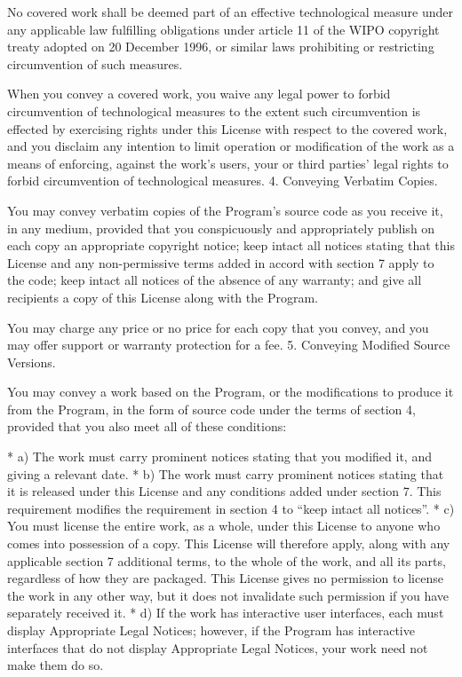 {\begin{multicols}{4}
No covered work shall be deemed part of an effective technological measure under any applicable law fulfilling obligations under article 11 of the WIPO copyright treaty adopted on 20 December 1996, or similar laws prohibiting or restricting circumvention of such measures.

When you convey a covered work, you waive any legal power to forbid circumvention of technological measures to the extent such circumvention is effected by exercising rights under this License with respect to the covered work, and you disclaim any intention to limit operation or modification of the work as a means of enforcing, against the work's users, your or third parties' legal rights to forbid circumvention of technological measures.
4. Conveying Verbatim Copies.

You may convey verbatim copies of the Program's source code as you receive it, in any medium, provided that you conspicuously and appropriately publish on each copy an appropriate copyright notice; keep intact all notices stating that this License and any non-permissive terms added in accord with section 7 apply to the code; keep intact all notices of the absence of any warranty; and give all recipients a copy of this License along with the Program.

You may charge any price or no price for each copy that you convey, and you may offer support or warranty protection for a fee.
5. Conveying Modified Source Versions.

You may convey a work based on the Program, or the modifications to produce it from the Program, in the form of source code under the terms of section 4, provided that you also meet all of these conditions:

    * a) The work must carry prominent notices stating that you modified it, and giving a relevant date.
    * b) The work must carry prominent notices stating that it is released under this License and any conditions added under section 7. This requirement modifies the requirement in section 4 to “keep intact all notices”.
    * c) You must license the entire work, as a whole, under this License to anyone who comes into possession of a copy. This License will therefore apply, along with any applicable section 7 additional terms, to the whole of the work, and all its parts, regardless of how they are packaged. This License gives no permission to license the work in any other way, but it does not invalidate such permission if you have separately received it.
    * d) If the work has interactive user interfaces, each must display Appropriate Legal Notices; however, if the Program has interactive interfaces that do not display Appropriate Legal Notices, your work need not make them do so.


\end{multicols}}
